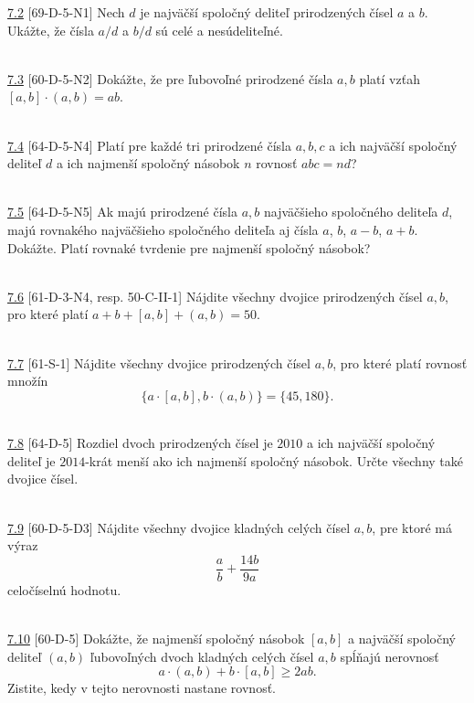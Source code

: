 \noindent \ul{7.2} [69-D-5-N1] Nech $d$ je najväčší spoločný deliteľ prirodzených čísel $a$ a $b$. Ukážte, že čísla $a/d$ a $b/d$ sú celé a nesúdeliteľné.


\\

\noindent \ul{7.3} [60-D-5-N2] Dokážte, že pre ľubovoľné prirodzené čísla $a, b$ platí vzťah $[a, b] \cdot (a, b) = ab$.


\\

\noindent \ul{7.4} [64-D-5-N4] Platí pre každé tri prirodzené čísla $a, b, c$ a ich najväčší spoločný deliteľ $d$ a ich najmenší spoločný násobok $n$ rovnosť $abc = nd$?


\\

\noindent \ul{7.5} [64-D-5-N5] Ak majú prirodzené čísla $a, b$ najväčšieho spoločného deliteľa $d$, majú rovnakého najväčšieho spoločného deliteľa aj čísla $a$, $b$, $a - b$, $a + b$. Dokážte. Platí rovnaké tvrdenie pre najmenší spoločný násobok?


\\

\noindent \ul{7.6} [61-D-3-N4, resp. 50-C-II-1] Nájdite všechny dvojice prirodzených čísel $a, b$, pro které platí $a+b+[a, b]+(a, b) = 50$.


\\

\noindent \ul{7.7} [61-S-1]
Nájdite všechny dvojice prirodzených čísel $a, b$, pro které platí rovnosť množín
$$\{a \cdot [a, b], b \cdot (a, b)\} = \{45, 180\}.$$


\\

\noindent \ul{7.8} [64-D-5]
Rozdiel dvoch prirodzených čísel je $2010$ a ich najväčší spoločný deliteľ je $2014$-krát menší ako ich najmenší spoločný násobok. Určte všechny také dvojice čísel.


\\

\noindent \ul{7.9} [60-D-5-D3] Nájdite všechny dvojice kladných celých čísel $a, b$, pre ktoré má výraz
$$\frac{a}{b}+\frac{14b}{9a}$$
celočíselnú hodnotu.


\\

\noindent \ul{7.10} [60-D-5]
Dokážte, že najmenší spoločný násobok $[a, b]$ a najväčší spoločný deliteľ $(a, b)$ ľubovoľných dvoch kladných celých čísel $a, b$ spĺňajú nerovnosť
$$a \cdot (a, b) + b \cdot [a, b] \geq 2ab.$$
Zistite, kedy v tejto nerovnosti nastane rovnosť.


